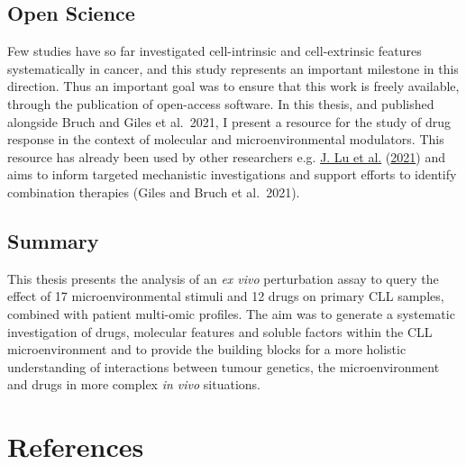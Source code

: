 \documentclass[11pt, a4paper, twosided]{book}
\begin{document}
\hypertarget{open-science}{%
\section{Open Science}\label{open-science}}

Few studies have so far investigated cell-intrinsic and cell-extrinsic features systematically in cancer, and this study represents an important milestone in this direction. Thus an important goal was to ensure that this work is freely available, through the publication of open-access software. In this thesis, and published alongside Bruch and Giles et al.~2021, I present a resource for the study of drug response in the context of molecular and microenvironmental modulators. This resource has already been used by other researchers e.g. \protect\hyperlink{ref-Lu2021}{J. Lu et al.} (\protect\hyperlink{ref-Lu2021}{2021}) and aims to inform targeted mechanistic investigations and support efforts to identify combination therapies (Giles and Bruch et al.~2021).

\hypertarget{summary-3}{%
\section{Summary}\label{summary-3}}

This thesis presents the analysis of an \emph{ex vivo} perturbation assay to query the effect of 17 microenvironmental stimuli and 12 drugs on primary CLL samples, combined with patient multi-omic profiles. The aim was to generate a systematic investigation of drugs, molecular features and soluble factors within the CLL microenvironment and to provide the building blocks for a more holistic understanding of interactions between tumour genetics, the microenvironment and drugs in more complex \emph{in vivo} situations.

\newpage

\hypertarget{references}{%
\chapter*{References}\label{references}}

\noindent

\setlength{\parindent}{-0.5cm}
\setlength{\leftskip}{0.5cm}
\setlength{\parskip}{8pt}
\end{document}
